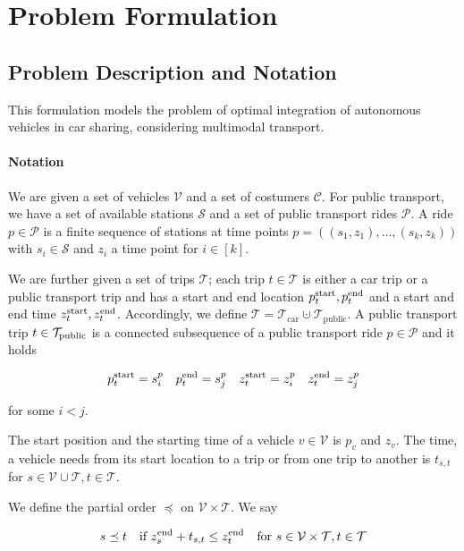 \section{Problem Formulation}

\subsection{Problem Description and Notation}

This formulation models the problem of optimal integration of autonomous vehicles in car sharing, considering multimodal transport.

\paragraph{Notation} \parfill

We are given a set of vehicles $\mathcal{V}$ and a set of costumers $\mathcal{C}$. For public transport, we have a set of available stations $\mathcal{S}$ and a set of public transport rides $\mathcal{P}$. A ride $p\in \mathcal{P}$ is a finite sequence of stations at time points $p=\left(\left(s_1,z_1\right),\dots,\left(s_k,z_k\right)\right)$ with $s_i\in\mathcal{S}$ and $z_i$ a time point for $i\in[k]$. 

We are further given a set of trips $\mathcal{T}$; each trip $t\in\mathcal{T}$ is either a car trip or a public transport trip and has a start and end location $p^{\operatorname{start}}_t, p^{\operatorname{end}}_t$ and a start and end time $z^{\operatorname{start}}_t, z^{\operatorname{end}}_t$. Accordingly, we define $\mathcal{T} = \mathcal{T}_{\operatorname{car}}\cupdot\mathcal{T}_{\operatorname{public}}$. A public transport trip $t\in\mathcal{T}_{\operatorname{public}}$ is a connected subsequence of a public transport ride $p\in\mathcal{P}$ and it holds

\begin{align*}
	p^{\operatorname{start}}_t = s^p_i & &  p^{\operatorname{end}}_t = s^p_j & & z^{\operatorname{start}}_t = z^p_i & & z^{\operatorname{end}}_t = z^p_j
\end{align*}

for some $i<j$.

The start position and the starting time of a vehicle $v\in\mathcal{V}$ is $p_v$ and $z_v$. The time, a vehicle needs from its start location to a trip or from one trip to another is $t_{s,t}$ for $s\in\mathcal{V}\cup\mathcal{T}, t\in\mathcal{T}$.

We define the partial order $\preceq$ on $\mathcal{V}\times\mathcal{T}$. We say

\begin{align*}
	s\preceq t & & \text{if } z^{\operatorname{end}}_s + t_{s,t} \leq z^{\operatorname{end}}_t & & \text{for } s\in\mathcal{V}\times\mathcal{T}, t\in\mathcal{T}
\end{align*}

